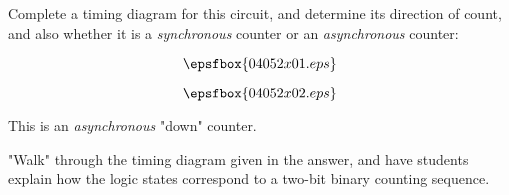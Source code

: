

Complete a timing diagram for this circuit, and determine its direction of count, and also whether it is a {\it synchronous} counter or an {\it asynchronous} counter:

$$\epsfbox{04052x01.eps}$$

$$\epsfbox{04052x02.eps}$$







This is an {\it asynchronous} "down" counter.








"Walk" through the timing diagram given in the answer, and have students explain how the logic states correspond to a two-bit binary counting sequence.




